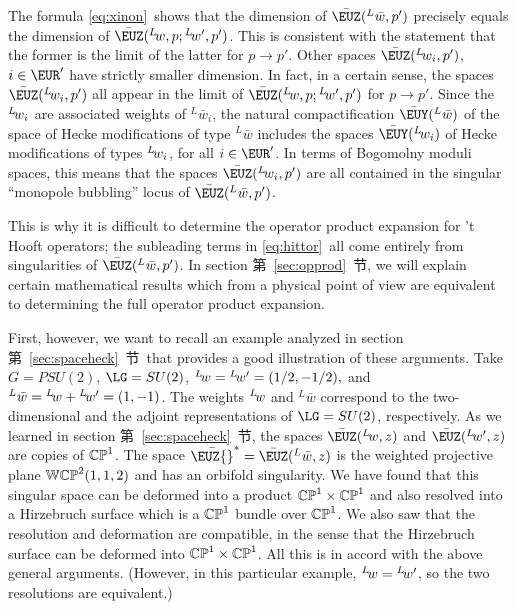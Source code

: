 The formula \eqref{eq:xinon}\ shows that the dimension of $\bar\EUZ(^L\bar
w,p')$ precisely equals the dimension of $\bar\EUZ(^L\negthinspace
w,p;{}^L\negthinspace w',p')$. This is consistent with the
statement that the former is the limit of the latter for $p\to
p'$.  Other spaces $\bar\EUZ(^L\negthinspace w_i,p')$, $i\in
\EUR'$ have strictly smaller dimension. In fact, in a certain
sense, the spaces $\bar\EUZ(^L\negthinspace w_i,p')$ all appear in
the limit of $\bar\EUZ(^L\negthinspace w,p;{}^L\negthinspace
w',p')$ for $p\to p'$. Since the $^L\negthinspace w_i$ are
associated weights of $^L\bar w_i$, the natural compactification
$\bar {{\EUY}}(^L\bar w)$ of the space of Hecke modifications of
type $^L\bar w$ includes the spaces $\bar {{\EUY}}(^L\negthinspace
w_i)$  of Hecke modifications of types $^L\negthinspace w_i$, for
all $i\in \EUR'$.  In terms of Bogomolny moduli spaces, this means
that the spaces $\bar\EUZ(^L\negthinspace w_i,p')$ are all
contained in the singular ``monopole bubbling'' locus of
$\bar\EUZ(^L\bar w,p')$.

This is why it is difficult to determine the operator product
expansion for 't Hooft operators; the subleading terms in \eqref{eq:hittor}\
all come entirely from singularities of $\bar\EUZ(^L\bar w,p')$.
In section 第~\ref{sec:opprod}~节, we will explain certain mathematical results
\cite{ref97,ref98} which from a
physical point of view are equivalent to determining the full
operator product expansion.

First, however, we want to recall an example analyzed in section
第~\ref{sec:spaceheck}~节\ that provides a good illustration of these arguments.
Take $G=PSU(2)$, $\LG=SU(2)$, $^L\negthinspace w={}^L\negthinspace
w'=(1/2,-1/2),$ and $^L\bar w={}^L\negthinspace
w+{}^L\negthinspace w'=(1,-1)$. The weights $^L\negthinspace w$
and $^L\bar w$ correspond to the two-dimensional and the adjoint
representations of $\LG=SU(2)$, respectively. As we learned in
section 第~\ref{sec:spaceheck}~节, the  spaces $\bar {{\EUZ}}(^L\negthinspace
w,z)$ and $\bar {{\EUZ}}(^L\negthinspace w',z)$ are copies of
$\Bbb{CP}^1$. The space $\bar\EUZ{}^*=\bar {{\EUZ}}(^L\bar w,z)$
is the weighted projective plane $\Bbb{WCP}^2(1,1,2)$ and has an
orbifold singularity. We have found that this singular space can
be deformed into a product $\Bbb{CP}^1\times\Bbb{CP}^1$ and also
resolved into a Hirzebruch surface which is a $\Bbb{CP}^1$ bundle
over $\Bbb{CP}^1$. We also saw that the resolution and deformation
are compatible, in the sense that the Hirzebruch surface can be
deformed into $\Bbb{CP}^1\times\Bbb{CP}^1$. All this is in accord
with the above general arguments.  (However, in this particular
example, $^L\negthinspace w={}^L\negthinspace w'$, so the two
resolutions are equivalent.)

